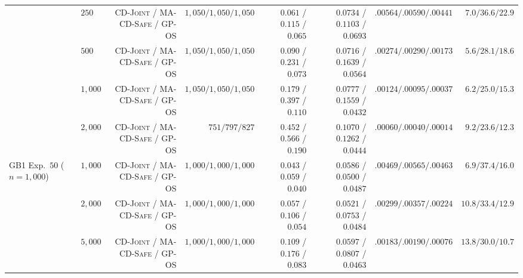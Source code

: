 \documentclass{article}
\theoremstyle{plain}
\theoremstyle{definition}
\begin{document}
\begin{table}[!htbp]
{\begin{tabular}{@{}llrrrrrr@{}}
  & $250$  & \textsc{CD-Joint} / \textsc{MA-CD-Safe} / \textsc{GP-OS} & $1{,}050 / 1{,}050 / 1{,}050$ & $0.061$ / $\mathbf{0.115}$ / $0.065$ & $0.0734$ / $\mathbf{0.1103}$ / $0.0693$ & $.00564 / .00590 / .00441$ & $7.0 / 36.6 / 22.9$ \\
  & $500$  & \textsc{CD-Joint} / \textsc{MA-CD-Safe} / \textsc{GP-OS} & $1{,}050 / 1{,}050 / 1{,}050$ & $0.090$ / $\mathbf{0.231}$ / $0.073$ & $0.0716$ / $\mathbf{0.1639}$ / $0.0564$ & $.00274 / .00290 / .00173$ & $5.6 / 28.1 / 18.6$ \\
  & $1{,}000$ & \textsc{CD-Joint} / \textsc{MA-CD-Safe} / \textsc{GP-OS} & $1{,}050 / 1{,}050 / 1{,}050$ & $0.179$ / $\mathbf{0.397}$ / $0.110$ & $0.0777$ / $\mathbf{0.1559}$ / $0.0432$ & $.00124 / .00095 / .00037$ & $6.2 / 25.0 / 15.3$ \\
  & $2{,}000$ & \textsc{CD-Joint} / \textsc{MA-CD-Safe} / \textsc{GP-OS} & $751 / 797 / 827$            & $0.452$ / $\mathbf{0.566}$ / $0.190$ & $0.1070$ / $\mathbf{0.1262}$ / $0.0444$ & $.00060 / .00040 / .00014$ & $9.2 / 23.6 / 12.3$ \\
\midrule
\multirow{3}{*}{GB1 Exp.\ $50$ ($n{=}1{,}000$)}
  & $1{,}000$ & \textsc{CD-Joint} / \textsc{MA-CD-Safe} / \textsc{GP-OS} & $1{,}000 / 1{,}000 / 1{,}000$ & $0.043$ / $\mathbf{0.059}$ / $0.040$ & $\mathbf{0.0586}$ / $0.0500$ / $0.0487$ & $.00469 / .00565 / .00463$ & $6.9 / 37.4 / 16.0$ \\
  & $2{,}000$ & \textsc{CD-Joint} / \textsc{MA-CD-Safe} / \textsc{GP-OS} & $1{,}000 / 1{,}000 / 1{,}000$ & $0.057$ / $\mathbf{0.106}$ / $0.054$ & $0.0521$ / $\mathbf{0.0753}$ / $0.0484$ & $.00299 / .00357 / .00224$ & $10.8 / 33.4 / 12.9$ \\
  & $5{,}000$ & \textsc{CD-Joint} / \textsc{MA-CD-Safe} / \textsc{GP-OS} & $1{,}000 / 1{,}000 / 1{,}000$ & $0.109$ / $\mathbf{0.176}$ / $0.083$ & $0.0597$ / $\mathbf{0.0807}$ / $0.0463$ & $.00183 / .00190 / .00076$ & $13.8 / 30.0 / 10.7$ \\
\bottomrule
\end{tabular}%
}
\end{table}
\end{document}
